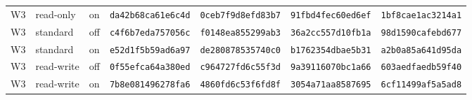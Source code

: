 \begin{tabular}{@{}lll ll ll@{}}
W3 & read-only & on & \texttt{da42b68ca61e6c4d} & \texttt{0ceb7f9d8efd83b7} & \texttt{91fbd4fec60ed6ef} & \texttt{1bf8cae1ac3214a1} \\
W3 & standard & off & \texttt{c4f6b7eda757056c} & \texttt{f0148ea855299ab3} & \texttt{36a2cc557d10fb1a} & \texttt{98d1590cafebd677} \\
W3 & standard & on & \texttt{e52d1f5b59ad6a97} & \texttt{de280878535740c0} & \texttt{b1762354dbae5b31} & \texttt{a2b0a85a641d95da} \\
W3 & read-write & off & \texttt{0f55efca64a380ed} & \texttt{c964727fd6c55f3d} & \texttt{9a39116070bc1a66} & \texttt{603aedfaedb59f40} \\
W3 & read-write & on & \texttt{7b8e081496278fa6} & \texttt{4860fd6c53f6fd8f} & \texttt{3054a71aa8587695} & \texttt{6cf11499af5a5ad8} \\
\bottomrule
\end{tabular}
